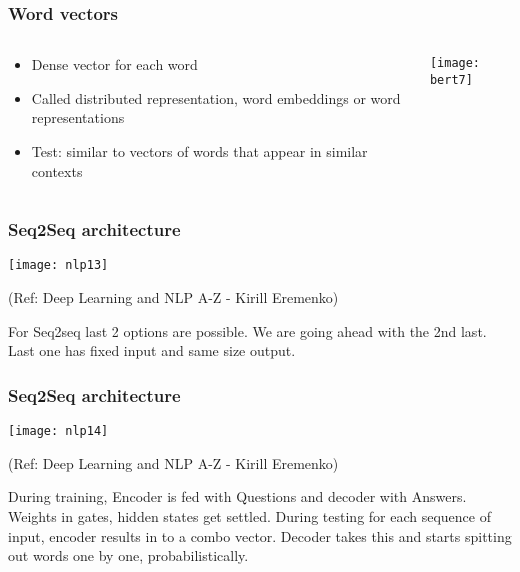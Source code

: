 \begin{frame}[fragile]\frametitle{Word vectors}

\begin{columns}
    \begin{column}[T]{0.5\linewidth}
			\begin{itemize}
			\item Dense vector for each word
			\item Called distributed representation, word embeddings or  word representations 
			\item Test: similar to vectors of words that appear in similar contexts
			\end{itemize}
    \end{column}
    \begin{column}[T]{0.5\linewidth}
			\begin{center}
			\texttt{[image: bert7]}
			\end{center}		  
    \end{column}
  \end{columns}

\end{frame}
\begin{frame}[fragile]\frametitle{Seq2Seq architecture}

\begin{center}
\texttt{[image: nlp13]}

\tiny{(Ref: Deep Learning and NLP A-Z - Kirill Eremenko)}
\end{center}

For Seq2seq last 2 options are possible. We are going ahead with the 2nd last. Last one has fixed input and same size output.

\end{frame}

\begin{frame}[fragile]\frametitle{Seq2Seq architecture}

\begin{center}
\texttt{[image: nlp14]}

\tiny{(Ref: Deep Learning and NLP A-Z - Kirill Eremenko)}
\end{center}
During training, Encoder is fed with Questions and decoder with Answers. Weights in gates, hidden states get settled. During testing for each sequence of input, encoder results in to a combo vector. Decoder takes this and starts spitting out words one by  one, probabilistically.

\end{frame}


